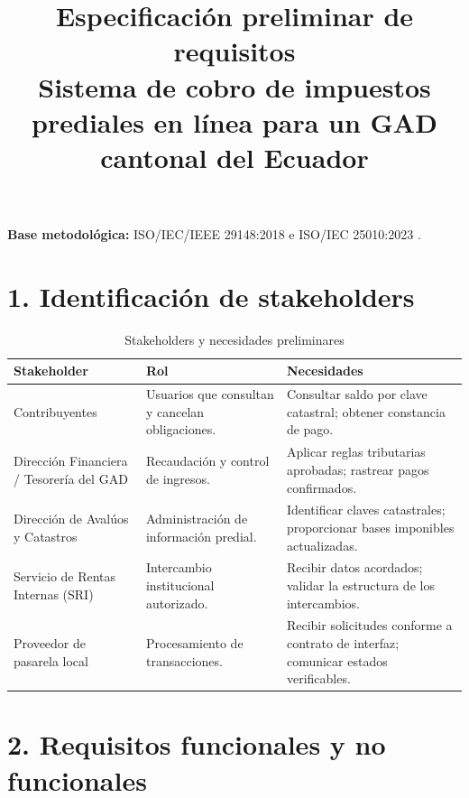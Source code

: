 \documentclass[conference,onecolumn]{IEEEtran}
\begin{document}
\title{Especificación preliminar de requisitos\\\large Sistema de cobro de impuestos prediales en línea para un GAD cantonal del Ecuador}
\author{
}
\maketitle
\vspace{-1.5em}
\noindent\textbf{Base metodológica:} ISO/IEC/IEEE 29148:2018 e ISO/IEC 25010:2023 \cite{iso29148,iso25010}.

\section*{1. Identificación de stakeholders}
\begin{table}[H]
\centering
\caption{Stakeholders y necesidades preliminares}
\label{tab:stakeholders}
\scriptsize
\setlength{\tabcolsep}{3pt}
\begin{tabularx}{\columnwidth}{@{}L{0.28\columnwidth}L{0.26\columnwidth}Y@{}}
\toprule
\textbf{Stakeholder} & \textbf{Rol} & \textbf{Necesidades}\\
\midrule
Contribuyentes & Usuarios que consultan y cancelan obligaciones. & Consultar saldo por clave catastral; obtener constancia de pago.\\
Dirección Financiera / Tesorería del GAD & Recaudación y control de ingresos. & Aplicar reglas tributarias aprobadas; rastrear pagos confirmados.\\
Dirección de Avalúos y Catastros & Administración de información predial. & Identificar claves catastrales; proporcionar bases imponibles actualizadas.\\
Servicio de Rentas Internas (SRI) & Intercambio institucional autorizado. & Recibir datos acordados; validar la estructura de los intercambios.\\
Proveedor de pasarela local & Procesamiento de transacciones. & Recibir solicitudes conforme a contrato de interfaz; comunicar estados verificables.\\
\bottomrule
\end{tabularx}
\end{table}


\section*{2. Requisitos funcionales y no funcionales}
\end{document}
